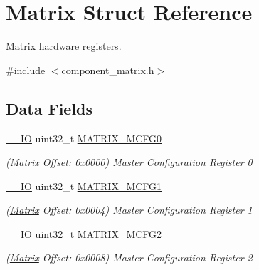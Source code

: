 \hypertarget{structMatrix}{}\section{Matrix Struct Reference}
\label{structMatrix}


\mbox{\hyperlink{structMatrix}{Matrix}} hardware registers.  




{\ttfamily \#include $<$component\+\_\+matrix.\+h$>$}

\subsection*{Data Fields}
\begin{DoxyCompactItemize}
\item 
\mbox{\label{structMatrix_af8532b5f181bc9aa18de8b619dc60e25}} 
\mbox{\hyperlink{core__cm7_8h_aec43007d9998a0a0e01faede4133d6be}{\+\_\+\+\_\+\+IO}} uint32\+\_\+t \mbox{\hyperlink{structMatrix_af8532b5f181bc9aa18de8b619dc60e25}{M\+A\+T\+R\+I\+X\+\_\+\+M\+C\+F\+G0}}
\begin{DoxyCompactList}\small\item\em (\mbox{\hyperlink{structMatrix}{Matrix}} Offset\+: 0x0000) Master Configuration Register 0 \end{DoxyCompactList}\item 
\mbox{\label{structMatrix_a4822172c78857575e6d93188fe88f03b}} 
\mbox{\hyperlink{core__cm7_8h_aec43007d9998a0a0e01faede4133d6be}{\+\_\+\+\_\+\+IO}} uint32\+\_\+t \mbox{\hyperlink{structMatrix_a4822172c78857575e6d93188fe88f03b}{M\+A\+T\+R\+I\+X\+\_\+\+M\+C\+F\+G1}}
\begin{DoxyCompactList}\small\item\em (\mbox{\hyperlink{structMatrix}{Matrix}} Offset\+: 0x0004) Master Configuration Register 1 \end{DoxyCompactList}\item 
\mbox{\label{structMatrix_a7fdb250ad6d6587d807bb6ca265c8625}} 
\mbox{\hyperlink{core__cm7_8h_aec43007d9998a0a0e01faede4133d6be}{\+\_\+\+\_\+\+IO}} uint32\+\_\+t \mbox{\hyperlink{structMatrix_a7fdb250ad6d6587d807bb6ca265c8625}{M\+A\+T\+R\+I\+X\+\_\+\+M\+C\+F\+G2}}
\begin{DoxyCompactList}\small\item\em (\mbox{\hyperlink{structMatrix}{Matrix}} Offset\+: 0x0008) Master Configuration Register 2 \end{DoxyCompactList}\item 

\end{DoxyCompactItemize}
